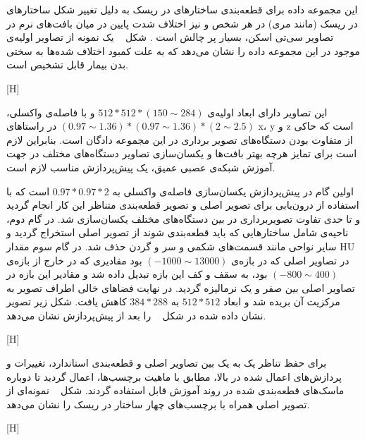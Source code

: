 این مجموعه داده برای قطعه‌بندی ساختارهای در ریسک به دلیل تغییر شکل ساختار‌های در ریسک (مانند مری) در هر شخص و نیز اختلاف شدت پایین در میان بافت‌های نرم در تصاویر سی‌تی اسکن، بسیار پر چالش است . شکل ~ یک نمونه از تصاویر اولیه‌ی موجود در این مجموعه داده را نشان می‌دهد که به علت کمبود اختلاف شده‌ها به سختی بدن بیمار قابل تشخیص است. 

[H]

این تصاویر دارای ابعاد اولیه‌ی $512*512*(150\sim 284)$ و با فاصله‌ی واکسلی،
 $(0.97\sim1.36)*(0.97\sim1.36)*(2\sim2.5)$
 در راستاهای x، y و z است که حاکی از متفاوت بودن دستگاه‌های تصویر برداری در این مجموعه دادگان است. بنابراین لازم است برای تمایز هرچه بهتر بافت‌ها و یکسان‌سازی تصاویر دستگاه‌های مختلف در جهت آموزش شبکه‌ی عصبی عمیق، یک پیش‌پردازش مناسب لازم است.
 
اولین گام در پیش‌پردازش یکسان‌سازی فاصله‌ی واکسلی به $0.97*0.97*2$ است که با استفاده از درون‌یابی برای تصویر اصلی و تصویر قطعه‌بندی متناظر این کار انجام گردید و تا حدی تفاوت تصویربرداری در بین دستگاه‌های مختلف یکسان‌سازی شد. در گام دوم، ناحیه‌ی شامل ساختارهایی که باید قطعه‌بندی شوند از تصویر اصلی استخراج گردید و سایر نواحی مانند قسمت‌های شکمی و سر و گردن حذف شد. در گام سوم مقدار HU در تصاویر اصلی که در بازه‌ی $(-1000\sim 13000)$ بود مقادیری که در خارج از بازه‌ی $(-800\sim 400)$ بود، به سقف و کف این بازه تبدیل داده شد و مقادیر این بازه در تصاویر اصلی بین صفر و یک نرمالیزه گردید. در نهایت فضاهای خالی اطراف تصویر به مرکزیت آن بریده شد و ابعاد $512*512$ به $384*288$ کاهش یافت. شکل زیر تصویر نشان داده شده در شکل ~ را بعد از پیش‌پردازش نشان می‌دهد.

[H]

برای حفظ تناظر یک به یک بین تصاویر اصلی و قطعه‌بندی استاندارد، تغییرات و پردازش‌های اعمال شده در بالا، مطابق با ماهیت برچسب‌ها، اعمال گردید تا دوباره ماسک‌های قطعه‌بندی شده در روند آموزش قابل استفاده گردند. شکل ~ نمونه‌ای از تصویر اصلی همراه با برچسب‌های چهار ساختار در ریسک را نشان می‌دهد.

[H]

